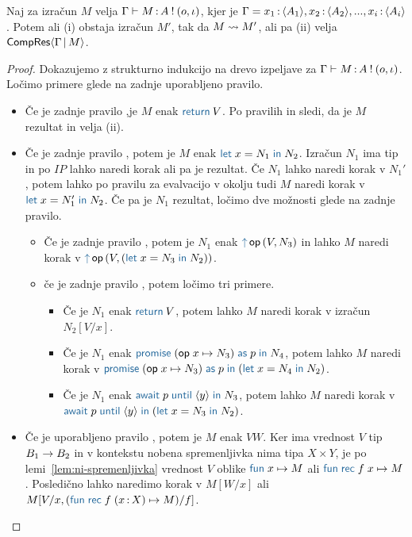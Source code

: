 \begin{trditev}[o napredku]\label{trd:gamma-napredek}
	Naj za izračun $M$ velja $\Gamma \vdash M \mathinner{:} A \mathbin{!} (o, \iota)$, kjer je $\Gamma = x_1 \mathinner{:} \langle A_1 \rangle, x_2 \mathinner{:} \langle A_2 \rangle,..., x_i \mathinner{:} \langle A_i \rangle$. Potem ali (i) obstaja izračun $M'$, tak da $M \leadsto M'$, ali pa (ii) velja $\mathsf{CompRes}\langle\Gamma \,\vert\, M\rangle$.
\end{trditev}

\begin{proof}
	Dokazujemo z strukturno indukcijo na drevo izpeljave za $\Gamma \vdash M \mathinner{:} A \mathbin{!} (o, \iota)$.
	Ločimo primere glede na zadnje uporabljeno pravilo.
	
	\begin{itemize}
		\item Če je zadnje pravilo ,je $M$ enak $\tmreturn{V}$. 
		Po pravilih  in  sledi, da je $M$ rezultat in velja (ii).
		
		\item Če je zadnje pravilo , potem je $M$ enak $\tmlet{x}{N_1}{N_2}$.
		Izračun $N_1$ ima tip in po $IP$ lahko naredi korak ali pa je rezultat. Če $N_1$ lahko naredi korak v $N_1'$, potem lahko po pravilu za evalvacijo v okolju tudi $M$ naredi korak v $\tmlet{x}{N_1'}{N_2}$.
		Če pa je $N_1$ rezultat, ločimo dve možnosti glede na zadnje pravilo. 
		\begin{itemize}
			\item Če je zadnje pravilo , potem je $N_1$ enak $\tmopout{op}{V}{N_3}$ in lahko $M$ naredi korak v $\tmopout{op}{V}{(\tmlet{x}{N_3}{N_2})}$.
			\item če je zadnje pravilo , potem ločimo tri primere.
			\begin{itemize}
				\item Če je $N_1$ enak $\tmreturn{V}$, potem lahko $M$ naredi korak v izračun $N_2[V/x]$.
				\item Če je $N_1$ enak $\tmwith{op}{x}{N_3}{p}{N_4}$, potem lahko $M$ naredi korak v $\tmwith{op}{x}{N_3}{p}{(\tmlet{x}{N_4}{N_2})}$.
				\item Če je $N_1$ enak $\tmawait{p}{y}{N_3}$, potem lahko $M$ naredi korak v $\tmawait{p}{y}{(\tmlet{x}{N_3}{N_2})}$.
			\end{itemize}
			
		\end{itemize}
	
		\item Če je uporabljeno pravilo , potem je $M$ enak $V W$.
		Ker ima vrednost $V$ tip $B_1 \to B_2$ in v kontekstu nobena spremenljivka nima tipa $X \times Y$, je po lemi~\ref{lem:ni-spremenljivka} vrednost $V$ oblike $\tmfunano{x}{M}$ ali $\tmfunrecano{f}{x}{M}$.
		Posledično lahko naredimo korak v $M[W/x]$ ali $M[V/x, (\tmfunrec{f}{x \of X}{M})/f]$.
		

\end{itemize}
\end{proof}
